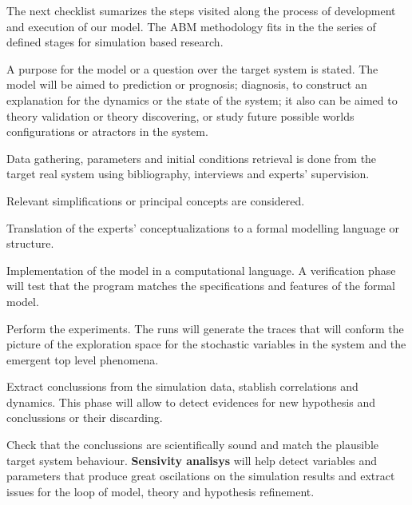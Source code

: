 \documentclass[11pt,oneside,a4paper,openright]{report}
\begin{document}
The next checklist sumarizes the steps visited along the process of development and execution of our model. The ABM methodology fits in the the series of defined stages for simulation based research. 

\begin{description}
\renewcommand{\labelitemi}{$\bullet$}
\renewcommand{\labelitemii}{$\cdot$}
\item [Definition of the target] A purpose for the model or a question over the target system is stated. The model will be aimed to prediction or prognosis; diagnosis, to construct an explanation for the dynamics or the state of the system; it also can be aimed to theory validation or theory discovering, or study future possible worlds configurations or atractors in the system.
\item [Observations] Data gathering, parameters and initial conditions retrieval is done from the target real system using bibliography, interviews and experts' supervision.
\item [Assumptions] Relevant simplifications or principal concepts are considered. 
\item [Design model] Translation of the experts' conceptualizations to a formal modelling language or structure. 
\item [Computer programming] Implementation of the model in a computational language. A verification phase will test that the program matches the specifications and features of the formal model.
\item [Run simulation] Perform the experiments. The runs will generate the traces that will conform the picture of the exploration space for the stochastic variables in the system and the emergent top level phenomena.
\item [Gather results] Extract conclussions from the simulation data, stablish correlations and dynamics. This phase will allow to detect evidences for new hypothesis and conclussions or their discarding.  
\item [Validation] Check that the conclussions are scientifically sound and match the plausible target system behaviour. \textbf{Sensivity analisys} will help detect variables and parameters that produce great oscilations on the simulation results and extract issues for the loop of model, theory and hypothesis refinement.
\end{description}


\end{document}
